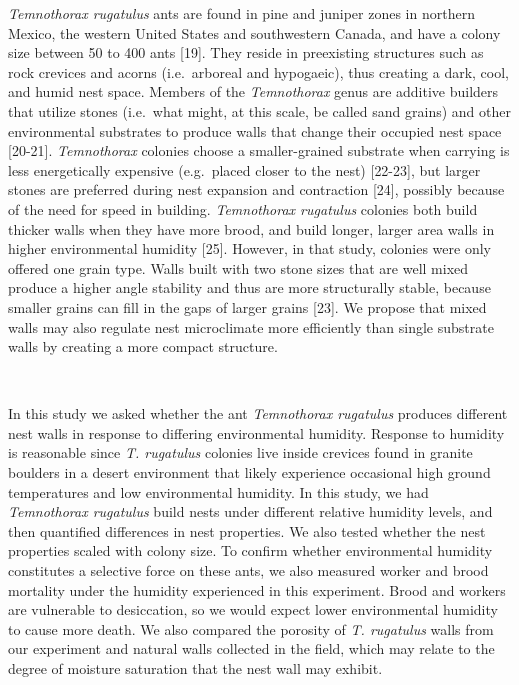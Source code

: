 \documentclass[3p]{elsarticle} %
\begin{document}
\emph{Temnothorax rugatulus} ants are found in pine and juniper zones in
northern Mexico, the western United States and southwestern Canada, and
have a colony size between 50 to 400 ants {[}19{]}. They reside in
preexisting structures such as rock crevices and acorns (i.e.~arboreal
and hypogaeic), thus creating a dark, cool, and humid nest space.
Members of the \emph{Temnothorax} genus are additive builders that
utilize stones (i.e.~what might, at this scale, be called sand grains)
and other environmental substrates to produce walls that change their
occupied nest space {[}20-21{]}. \emph{Temnothorax} colonies choose a
smaller-grained substrate when carrying is less energetically expensive
(e.g.~placed closer to the nest) {[}22-23{]}, but larger stones are
preferred during nest expansion and contraction {[}24{]}, possibly
because of the need for speed in building. \emph{Temnothorax rugatulus}
colonies both build thicker walls when they have more brood, and build
longer, larger area walls in higher environmental humidity {[}25{]}.
However, in that study, colonies were only offered one grain type. Walls
built with two stone sizes that are well mixed produce a higher angle
stability and thus are more structurally stable, because smaller grains
can fill in the gaps of larger grains {[}23{]}. We propose that mixed
walls may also regulate nest microclimate more efficiently than single
substrate walls by creating a more compact structure.

~

In this study we asked whether the ant \emph{Temnothorax rugatulus}
produces different nest walls in response to differing environmental
humidity. Response to humidity is reasonable since \emph{T. rugatulus}
colonies live inside crevices found in granite boulders in a desert
environment that likely experience occasional high ground temperatures
and low environmental humidity. In this study, we had \emph{Temnothorax
rugatulus} build nests under different relative humidity levels, and
then quantified differences in nest properties. We also tested whether
the nest properties scaled with colony size. To confirm whether
environmental humidity constitutes a selective force on these ants, we
also measured worker and brood mortality under the humidity experienced
in this experiment. Brood and workers are vulnerable to desiccation, so
we would expect lower environmental humidity to cause more death. We
also compared the porosity of \emph{T. rugatulus} walls from our
experiment and natural walls collected in the field, which may relate to
the degree of moisture saturation that the nest wall may exhibit.
\end{document}
